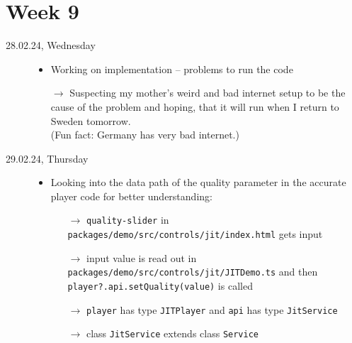 \documentclass[a4, 11pt]{scrartcl}
\begin{document}
\newpage
\section*{Week 9}	





\begin{description}



\item[28.02.24, Wednesday]
\begin{itemize}
	\item[]
	\item Working on implementation -- problems to run the code 
	\item[$\rightarrow$] Suspecting my mother's weird and bad internet setup to be the cause of the problem and hoping, that it will run when I return to Sweden tomorrow. \\
	(Fun fact: Germany has very bad internet.)
\end{itemize}



\item[29.02.24, Thursday]
\begin{itemize}
	\item[]
	\item Looking into the data path of the quality parameter in the accurate player code for better understanding:
	\begin{itemize}
		\item[$\rightarrow$] \texttt{quality-slider} in \texttt{packages/demo/src/controls/jit/index.html} gets input
		
		\item[$\rightarrow$] input value is read out in \texttt{packages/demo/src/controls/jit/JITDemo.ts} and then \texttt{player?.api.setQuality(value)} is called
		
		\item[$\rightarrow$] \texttt{player} has type \texttt{JITPlayer} and \texttt{api} has type \texttt{JitService}
		
		\item[$\rightarrow$] class \texttt{JitService} extends class \texttt{Service} 
	\end{itemize}
\end{itemize}












\end{description}
\end{document}
